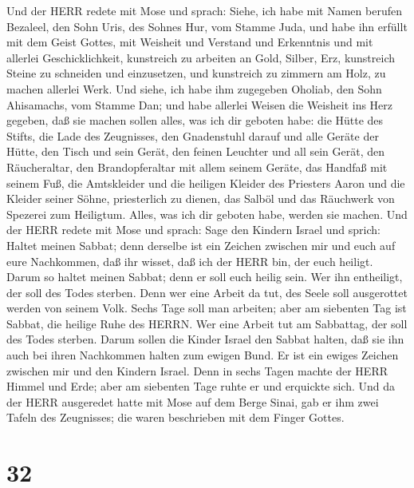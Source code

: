  Und der HERR redete mit Mose und sprach: 
Siehe, ich habe mit Namen berufen Bezaleel, den Sohn Uris, des Sohnes
Hur, vom Stamme Juda,  und habe ihn erfüllt mit dem Geist
Gottes, mit Weisheit und Verstand und Erkenntnis und mit allerlei
Geschicklichkeit,  kunstreich zu arbeiten an Gold, Silber,
Erz,  kunstreich Steine zu schneiden und einzusetzen, und
kunstreich zu zimmern am Holz, zu machen allerlei Werk.  Und
siehe, ich habe ihm zugegeben Oholiab, den Sohn Ahisamachs, vom Stamme
Dan; und habe allerlei Weisen die Weisheit ins Herz gegeben, daß sie
machen sollen alles, was ich dir geboten habe:  die Hütte
des Stifts, die Lade des Zeugnisses, den Gnadenstuhl darauf und alle
Geräte der Hütte,  den Tisch und sein Gerät, den feinen
Leuchter und all sein Gerät, den Räucheraltar,  den
Brandopferaltar mit allem seinem Geräte, das Handfaß mit seinem Fuß,
 die Amtskleider und die heiligen Kleider des Priesters
Aaron und die Kleider seiner Söhne, priesterlich zu dienen,
 das Salböl und das Räuchwerk von Spezerei zum Heiligtum.
Alles, was ich dir geboten habe, werden sie machen.  Und
der HERR redete mit Mose und sprach:  Sage den Kindern
Israel und sprich: Haltet meinen Sabbat; denn derselbe ist ein Zeichen
zwischen mir und euch auf eure Nachkommen, daß ihr wisset, daß ich der
HERR bin, der euch heiligt.  Darum so haltet meinen Sabbat;
denn er soll euch heilig sein. Wer ihn entheiligt, der soll des Todes
sterben. Denn wer eine Arbeit da tut, des Seele soll ausgerottet werden
von seinem Volk.  Sechs Tage soll man arbeiten; aber am
siebenten Tag ist Sabbat, die heilige Ruhe des HERRN. Wer eine Arbeit
tut am Sabbattag, der soll des Todes sterben.  Darum sollen
die Kinder Israel den Sabbat halten, daß sie ihn auch bei ihren
Nachkommen halten zum ewigen Bund.  Er ist ein ewiges
Zeichen zwischen mir und den Kindern Israel. Denn in sechs Tagen machte
der HERR Himmel und Erde; aber am siebenten Tage ruhte er und erquickte
sich.  Und da der HERR ausgeredet hatte mit Mose auf dem
Berge Sinai, gab er ihm zwei Tafeln des Zeugnisses; die waren
beschrieben mit dem Finger Gottes.

\hypertarget{section-31}{%
\section{32}\label{section-31}}

